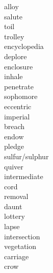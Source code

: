 \documentclass[b5paper, 11pt]{ctexart}
\begin{document}
\begin{multicols*}{3}
\begin{description}
\item[alloy]

\item[salute]

\item[toil]

\item[trolley]

\item[encyclopedia]

\item[deplore]

\item[enclosure]

\item[inhale]

\item[penetrate]

\item[sophomore]

\item[eccentric]

\item[imperial]

\item[breach]

\item[endow]

\item[pledge]

\item[sulfur/sulphur]

\item[quiver]

\item[intermediate]

\item[cord]

\item[removal]

\item[daunt]

\item[lottery]

\item[lapse]

\item[intersection]

\item[vegetation]

\item[carriage]

\item[crow]


\end{description}
\end{multicols*}
\end{document}

